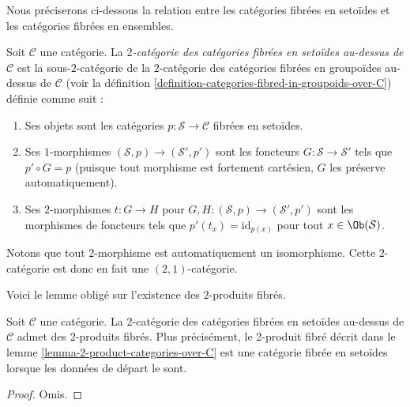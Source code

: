\noindent
Nous préciserons ci-dessous la relation entre les catégories fibrées en
setoïdes et les catégories fibrées en ensembles.

\begin{definition}
\label{definition-categories-fibred-in-setoids-over-C}
Soit $\mathcal{C}$ une catégorie.
La {\it $2$-catégorie des catégories fibrées en setoïdes
au-dessus de $\mathcal{C}$} est la sous-$2$-catégorie de la $2$-catégorie des
catégories fibrées en groupoïdes au-dessus de $\mathcal{C}$ (voir la
définition \ref{definition-categories-fibred-in-groupoids-over-C})
définie comme suit :
\begin{enumerate}
\item Ses objets sont les catégories
$p : \mathcal{S} \to \mathcal{C}$ fibrées en setoïdes.
\item Ses $1$-morphismes $(\mathcal{S}, p) \to (\mathcal{S}', p')$
sont les foncteurs $G : \mathcal{S} \to \mathcal{S}'$ tels que
$p' \circ G = p$ (puisque tout morphisme est fortement cartésien,
$G$ les préserve automatiquement).
\item Ses $2$-morphismes $t : G \to H$ pour
$G, H : (\mathcal{S}, p) \to (\mathcal{S}', p')$
sont les morphismes de foncteurs
tels que $p'(t_x) = \text{id}_{p(x)}$
pour tout $x \in \Ob(\mathcal{S})$.
\end{enumerate}
\end{definition}

\noindent
Notons que tout $2$-morphisme est automatiquement un isomorphisme.
Cette $2$-catégorie est donc en fait une $(2, 1)$-catégorie.

\noindent
Voici le lemme obligé sur l'existence des $2$-produits fibrés.

\begin{lemma}
\label{lemma-2-product-categories-fibred-setoids}
Soit $\mathcal{C}$ une catégorie.
La 2-catégorie des catégories fibrées en setoïdes au-dessus de
$\mathcal{C}$ admet des 2-produits fibrés. Plus précisément, le 2-produit fibré
décrit dans le lemme \ref{lemma-2-product-categories-over-C} est une catégorie
fibrée en setoïdes lorsque les données de départ le sont.
\end{lemma}

\begin{proof}
Omis.
\end{proof}

